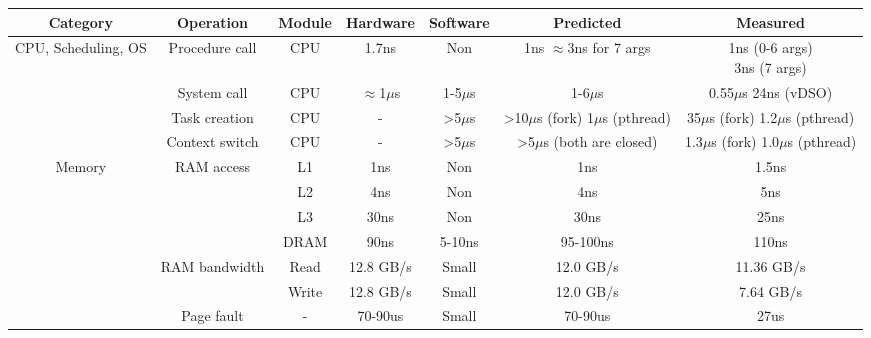 
\begin{table*}[t]
	\centering
	\begin{tabular}{c|c|c|c|c|c|c}
		\hline
		\textbf{Category} & \textbf{Operation} & \textbf{Module} & \textbf{Hardware} & \textbf{Software}  & \textbf{Predicted} & \textbf{Measured} \\ \hline \hline

		\multirow{4}{*}{CPU, Scheduling, OS} & Procedure call & CPU & 1.7ns & Non  & \makecell{1ns \\ $\approx$3ns \\ for 7 args} & \makecell{1ns (0-6 args) \\ 3ns (7 args)} \\ \cline{2-7}

          & System call & CPU & $\approx$1$\mu$s & 1-5$\mu$s & 1-6$\mu$s & \makecell{0.55$\mu$s \\ 24ns (vDSO)} \\ \cline{2-7}
          
          & Task creation & CPU & - & >5$\mu$s & \makecell{>10$\mu$s (fork) \\ 1$\mu$s (pthread)} & \makecell{35$\mu$s (fork) \\ 1.2$\mu$s (pthread)} \\ \cline{2-7}
        
          & Context switch & CPU & - & >5$\mu$s & \makecell{>5$\mu$s \\  (both are closed)} & \makecell{1.3$\mu$s (fork) \\ 1.0$\mu$s (pthread)} \\ \hline

        \multirow{6}{*}{Memory} & \multirow{4}{*}{RAM access} & L1 & 1ns & Non & 1ns & 1.5ns \\ \cline{3-7}
                                &  & L2 & 4ns & Non & 4ns & 5ns \\ \cline{3-7}
                                &  & L3 & 30ns & Non & 30ns & 25ns \\ \cline{3-7}
                                &  & DRAM & 90ns & 5-10ns & 95-100ns & 110ns \\ \cline{2-7}

          & \multirow{2}{*}{RAM bandwidth} & Read & 12.8 GB/s & Small & 12.0 GB/s &  11.36 GB/s \\ \cline{3-7}

          & & Write & 12.8 GB/s & Small & 12.0 GB/s & 7.64 GB/s \\ \cline{2-7}

          & Page fault & - & 70-90us & Small & 70-90us & 27us \\ \hline


\end{tabular}
\end{table*}
